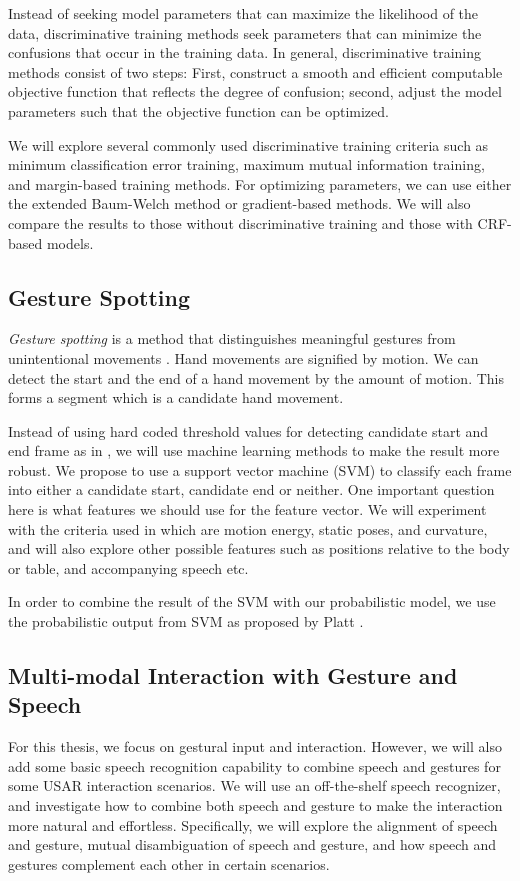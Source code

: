 Instead of seeking model parameters that can maximize the likelihood of the
data, discriminative training methods seek parameters that can minimize the
confusions that occur in the training data. In general, discriminative training
methods consist of two steps: First, construct a smooth and efficient computable
objective function that reflects the degree of confusion; second, adjust the
model parameters such that the objective function can be optimized. 

We will explore several commonly used discriminative training criteria such as
minimum classification error training, maximum mutual
information training, and margin-based training methods. For optimizing
parameters, we can use either the extended Baum-Welch method or gradient-based
methods. We will also compare the results to those without discriminative
training and those with CRF-based models.

\subsection{Gesture Spotting}
\textit{Gesture spotting} is a method that
distinguishes meaningful gestures from unintentional movements \cite{kang04}.
Hand movements are signified by motion. We can detect the start and the end of a hand movement by the amount of motion. This forms a segment
which is a candidate hand movement. 

Instead of using hard coded threshold values for detecting candidate
start and end frame as in \cite{kang04}, we will use machine learning methods to
make the result more robust. We propose to use a support vector machine (SVM) to
classify each frame into either a candidate start, candidate end or neither. One
important question here is what features we should use for the feature vector.
We will experiment with the criteria used in \cite{kang04} which are motion
energy, static poses, and curvature, and will also explore other possible
features such as positions relative to the body or table, and accompanying
speech etc.

In order to combine the result of the SVM with our probabilistic model, we use
the probabilistic output from SVM as proposed by Platt \cite{platt99}.

\subsection{Multi-modal Interaction with Gesture and Speech} 
For this thesis, we focus on gestural input and interaction. However, we will
also add some basic speech recognition capability to combine speech and gestures
for some USAR interaction scenarios. We will use an off-the-shelf speech 
recognizer, and investigate how to combine both speech and gesture to make
the interaction more natural and effortless. Specifically, we will explore the
alignment of speech and gesture, mutual disambiguation of speech and gesture,
and how speech and gestures complement each other in certain scenarios.

